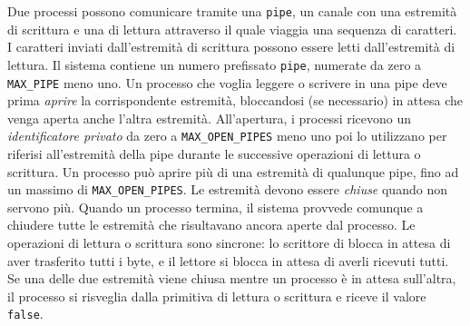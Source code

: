Due processi possono comunicare tramite una \verb|pipe|, un canale con una estremit\`a di scrittura e una
di lettura attraverso il quale viaggia una sequenza di caratteri. I caratteri inviati dall'estremit\`a di
scrittura possono essere letti dall'estremit\`a di lettura.
Il sistema contiene un numero prefissato \verb|pipe|, numerate da zero a \verb|MAX_PIPE| meno uno.
Un processo che voglia leggere o scrivere in una pipe deve prima {\em aprire} la corrispondente
estremit\`a, bloccandosi (se necessario) in attesa che venga aperta anche l'altra estremit\`a.
All'apertura, i processi ricevono un {\em identificatore privato} da zero a \verb|MAX_OPEN_PIPES| meno uno poi lo utilizzano per riferisi all'estremit\`a della pipe
durante le successive operazioni di lettura o scrittura. Un processo pu\`o aprire pi\`u
di una estremit\`a di qualunque pipe, fino ad un massimo di \verb|MAX_OPEN_PIPES|. Le estremit\`a devono essere {\em chiuse} quando
non servono pi\`u. Quando un processo termina, il sistema provvede comunque a chiudere tutte le estremit\`a che risultavano ancora aperte dal processo.
Le operazioni di lettura o scrittura
sono sincrone: lo scrittore di blocca in attesa di aver trasferito tutti i byte, e il lettore si
blocca in attesa di averli ricevuti tutti. Se una delle due estremit\`a viene chiusa mentre un processo
\`e in attesa sull'altra, il processo si risveglia dalla primitiva di lettura o scrittura e riceve
il valore \verb|false|.

